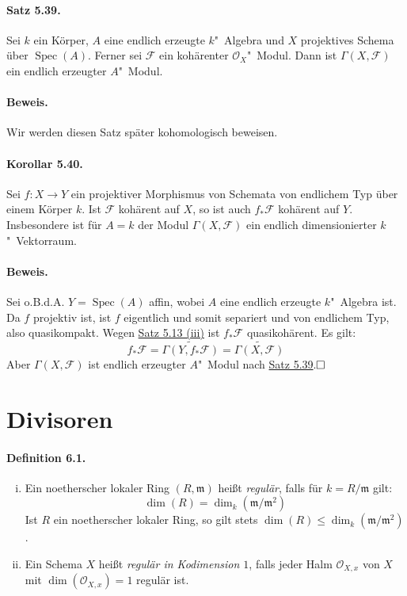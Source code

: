 \documentclass[11pt,b5paper,openany]{memoir}
\def \qed {$\hfill\square$}
\begin{document}
\paragraph{Satz 5.39.}\label{5.39} Sei $k$ ein Körper, $A$ eine endlich erzeugte $k$"~Algebra und $X$ projektives Schema über $\operatorname{Spec}(A)$. Ferner sei $\mathcal{F}$ ein kohärenter $\mathcal{O}_X$"~Modul. Dann ist $\Gamma(X,\mathcal{F})$ ein endlich erzeugter $A$"~Modul.

\paragraph{Beweis.} Wir werden diesen Satz später kohomologisch beweisen.

\paragraph{Korollar 5.40.}\label{5.40} Sei $f:X\to Y$ ein projektiver Morphismus von Schemata von endlichem Typ über einem Körper $k$. Ist $\mathcal{F}$ kohärent auf $X$, so ist auch $f_\ast\mathcal{F}$ kohärent auf $Y$. Insbesondere ist für $A=k$ der Modul $\Gamma(X,\mathcal{F})$ ein endlich dimensionierter $k$"~Vektorraum.

\paragraph{Beweis.} Sei o.B.d.A. $Y=\operatorname{Spec}(A)$ affin, wobei $A$ eine endlich erzeugte $k$"~Algebra ist. Da $f$ projektiv ist, ist $f$ eigentlich und somit separiert und von endlichem Typ, also quasikompakt. Wegen \hyperref[5.13]{Satz 5.13 (iii)} ist $f_\ast\mathcal{F}$ quasikohärent. Es gilt:
\[f_\ast\mathcal{F} = \widetilde{\Gamma(Y,f_\ast\mathcal{F})}=\widetilde{\Gamma(X,\mathcal{F})} \]
Aber $\Gamma(X,\mathcal{F})$ ist endlich erzeugter $A$"~Modul nach \hyperref[5.39]{Satz 5.39}.\qed

\section{Divisoren}

\paragraph{Definition 6.1.}\label{6.1} \begin{enumerate}[(i)]
\item Ein noetherscher lokaler Ring $(R,\mathfrak{m})$ heißt \textit{regulär}, falls für $k=R/\mathfrak{m}$ gilt:
\[\dim(R)=\dim_k (\mathfrak{m}/\mathfrak{m}^2)\]
Ist $R$ ein noetherscher lokaler Ring, so gilt stets $\dim(R)\leq\dim_k(\mathfrak{m}/\mathfrak{m}^2)$.
\item Ein Schema $X$ heißt \textit{regulär in Kodimension $1$}, falls jeder Halm $\mathcal{O}_{X,x}$ von $X$ mit $\dim(\mathcal{O}_{X,x})=1$ regulär ist.
\end{enumerate}
\end{document}
